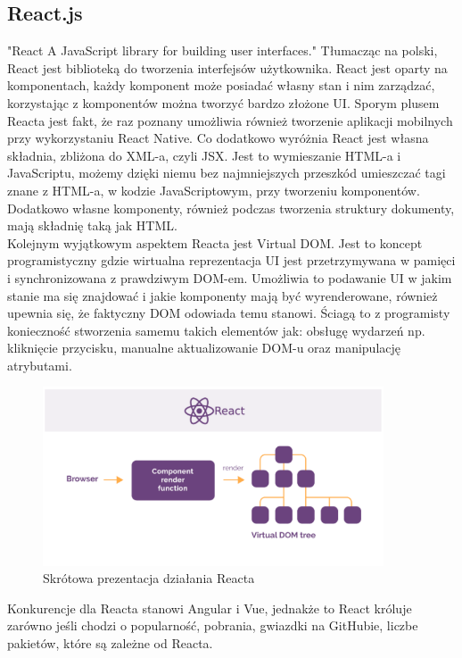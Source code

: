 \documentclass[12pt]{article}
\begin{document}
\begin{sloppypar}
{\subsection{React.js}
{
  "React A JavaScript library for building user interfaces."\cite{react} Tłumacząc na polski, React jest biblioteką do tworzenia interfejsów użytkownika. 
  React jest oparty na komponentach, każdy komponent może posiadać własny stan i nim zarządzać, korzystając z komponentów można tworzyć bardzo złożone UI. 
  Sporym plusem Reacta jest fakt, że raz poznany umożliwia również tworzenie aplikacji mobilnych przy wykorzystaniu React Native. Co dodatkowo wyróżnia React 
  jest własna składnia, zbliżona do XML-a, czyli JSX. Jest to wymieszanie HTML-a i JavaScriptu, możemy dzięki niemu bez najmniejszych przeszkód umieszczać 
  tagi znane z HTML-a, w kodzie JavaScriptowym, przy tworzeniu komponentów. Dodatkowo własne komponenty, również podczas tworzenia struktury dokumenty, mają 
  składnię taką jak HTML. \\
  Kolejnym wyjątkowym aspektem Reacta jest Virtual DOM. Jest to koncept programistyczny gdzie wirtualna reprezentacja UI jest 
  przetrzymywana w pamięci i synchronizowana z prawdziwym DOM-em. 
  Umożliwia to podawanie UI w jakim stanie ma się znajdować i jakie komponenty mają być wyrenderowane, również upewnia się, że faktyczny DOM odowiada temu stanowi. 
  Ściagą to z programisty konieczność stworzenia samemu takich elementów jak: obsługę wydarzeń np. kliknięcie przycisku, manualne aktualizowanie DOM-u oraz manipulację atrybutami.
  \begin{figure}[H]
    \centering
    \includegraphics[width=0.9\textwidth]{how_react_works.PNG}
    \caption{Skrótowa prezentacja działania Reacta}
    \label{fig:how-react-works}
  \end{figure}
  Konkurencje dla Reacta stanowi Angular i Vue, jednakże to React króluje zarówno jeśli chodzi o popularność, pobrania, gwiazdki na GitHubie, liczbe pakietów, które są zależne od Reacta. 
}}
\end{sloppypar}
\end{document}
